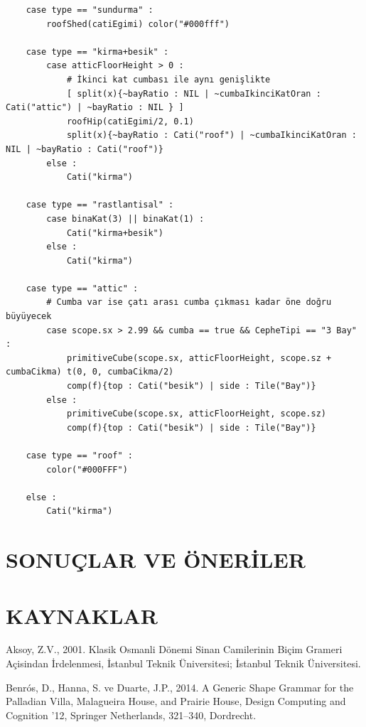 \documentclass[12pt,turkish,a4paperpaper,]{report}
\begin{document}
\begin{verbatim}
    case type == "sundurma" :
        roofShed(catiEgimi) color("#000fff")

    case type == "kirma+besik" :
        case atticFloorHeight > 0 :
            # İkinci kat cumbası ile aynı genişlikte
            [ split(x){~bayRatio : NIL | ~cumbaIkinciKatOran : Cati("attic") | ~bayRatio : NIL } ]
            roofHip(catiEgimi/2, 0.1)
            split(x){~bayRatio : Cati("roof") | ~cumbaIkinciKatOran : NIL | ~bayRatio : Cati("roof")}
        else :
            Cati("kirma")

    case type == "rastlantisal" :
        case binaKat(3) || binaKat(1) :
            Cati("kirma+besik")
        else :
            Cati("kirma")

    case type == "attic" :
        # Cumba var ise çatı arası cumba çıkması kadar öne doğru büyüyecek
        case scope.sx > 2.99 && cumba == true && CepheTipi == "3 Bay" :
            primitiveCube(scope.sx, atticFloorHeight, scope.sz + cumbaCikma) t(0, 0, cumbaCikma/2)
            comp(f){top : Cati("besik") | side : Tile("Bay")}
        else :
            primitiveCube(scope.sx, atticFloorHeight, scope.sz)
            comp(f){top : Cati("besik") | side : Tile("Bay")}

    case type == "roof" :
        color("#000FFF")

    else :
        Cati("kirma")
\end{verbatim}

\hypertarget{sonuuxe7lar-ve-uxf6neriler}{%
\chapter{SONUÇLAR VE ÖNERİLER}\label{sonuuxe7lar-ve-uxf6neriler}}

\thispagestyle{empty}

\chapter{KAYNAKLAR}

\thispagestyle{empty}

\hypertarget{refs}{}
\leavevmode\hypertarget{ref-Aksoy:2001wz}{}%
Aksoy, Z.V., 2001. Klasik Osmanli Dönemi Sinan Camilerinin Biçim Grameri
Açisindan İrdelenmesi, İstanbul Teknik Üniversitesi; İstanbul Teknik
Üniversitesi.

\leavevmode\hypertarget{ref-Benros:2014bx}{}%
Benrós, D., Hanna, S. ve Duarte, J.P., 2014. A Generic Shape Grammar for
the Palladian Villa, Malagueira House, and Prairie House, Design
Computing and Cognition '12, Springer Netherlands, 321--340, Dordrecht.
\end{document}
